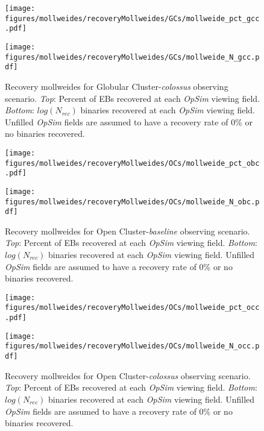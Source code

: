 \documentclass[twocolumn]{aastex63}
\begin{document}
\begin{figure}

    \centering
    \texttt{[image: figures/mollweides/recoveryMollweides/GCs/mollweide\_pct\_gcc.pdf]}

    \texttt{[image: figures/mollweides/recoveryMollweides/GCs/mollweide\_N\_gcc.pdf]}

    \caption{Recovery mollweides for Globular Cluster-\textit{colossus} observing scenario. \textit{Top}: Percent of EBs recovered at each \textit{OpSim} viewing field. \textit{Bottom}: $log(N_{rec})$ binaries recovered at each \textit{OpSim} viewing field. Unfilled \textit{OpSim} fields are assumed to have a recovery rate of 0\% or no binaries recovered.}
    \label{fig:gcc_recovery_mollweides}
\end{figure}

\begin{figure}
    \centering
    \texttt{[image: figures/mollweides/recoveryMollweides/OCs/mollweide\_pct\_obc.pdf]}

    \texttt{[image: figures/mollweides/recoveryMollweides/OCs/mollweide\_N\_obc.pdf]}

    \caption{Recovery mollweides for Open Cluster-\textit{baseline} observing scenario. \textit{Top}: Percent of EBs recovered at each \textit{OpSim} viewing field. \textit{Bottom}: $log(N_{rec})$ binaries recovered at each \textit{OpSim} viewing field. Unfilled \textit{OpSim} fields are assumed to have a recovery rate of 0\% or no binaries recovered.}
    \label{fig:obc_recovery_mollweides}
\end{figure}

\begin{figure}
    \centering
    \texttt{[image: figures/mollweides/recoveryMollweides/OCs/mollweide\_pct\_occ.pdf]}

    \texttt{[image: figures/mollweides/recoveryMollweides/OCs/mollweide\_N\_occ.pdf]}

    \caption{Recovery mollweides for Open Cluster-\textit{colossus} observing scenario. \textit{Top}: Percent of EBs recovered at each \textit{OpSim} viewing field. \textit{Bottom}: $log(N_{rec})$ binaries recovered at each \textit{OpSim} viewing field. Unfilled \textit{OpSim} fields are assumed to have a recovery rate of 0\% or no binaries recovered.}
    \label{fig:occ_recovery_mollweides}
\end{figure}
\end{document}
